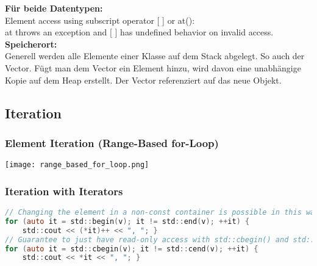 \textbf{Für beide Datentypen:}\\
Element access using subscript operator [ ] or at():\\
at throws an exception and [ ] has undefined behavior on invalid access.\\

\textbf{Speicherort:}\\
Generell werden alle Elemente einer Klasse auf dem Stack abgelegt. So auch der Vector. Fügt man dem Vector ein Element hinzu, wird davon eine unabhängige Kopie auf dem Heap erstellt. Der Vector referenziert auf das neue Objekt.

\subsection{Iteration}
\subsubsection{Element Iteration (Range-Based for-Loop)}
\begin{center}
    \texttt{[image: range\_based\_for\_loop.png]}
\end{center}
\subsubsection{Iteration with Iterators}
\begin{lstlisting}[style=frame, style= linenumbers, language=C]
// Changing the element in a non-const container is possible in this way
for (auto it = std::begin(v); it != std::end(v); ++it) {
    std::cout << (*it)++ << ", "; }
// Guarantee to just have read-only access with std::cbegin() and std::cend()
for (auto it = std::cbegin(v); it != std::cend(v); ++it) {
    std::cout << *it << ", "; }
\end{lstlisting}

